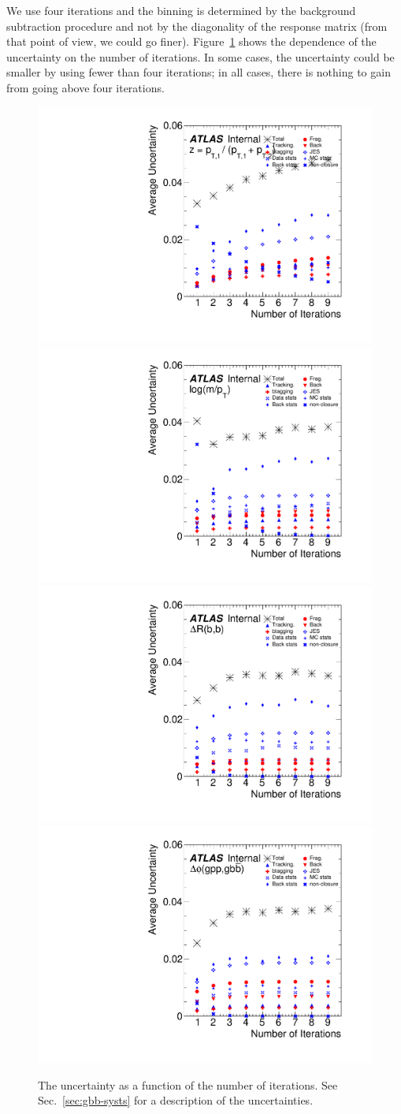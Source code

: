 \label{app:gbb-unfolding:optimization}
We use four iterations and the binning is determined by the background subtraction procedure and not by the diagonality of the response matrix (from that point of view, we could go finer).  Figure~\ref{fig:gbb-iterations} shows the dependence of the uncertainty on the number of iterations.  In some cases, the uncertainty could be smaller by using fewer than four iterations; in all cases, there is nothing to gain from going above four iterations.



\begin{figure}[htpb!]
\begin{center}
  \includegraphics[width=0.45\linewidth]{figures/gbb/Unfolding/IterationsTest_ZpT}
  \includegraphics[width=0.45\linewidth]{figures/gbb/Unfolding/IterationsTest_fracmasspt}
  \includegraphics[width=0.45\linewidth]{figures/gbb/Unfolding/IterationsTest_dR}
  \includegraphics[width=0.45\linewidth]{figures/gbb/Unfolding/IterationsTest_dphi}
\caption[]{The uncertainty as a function of the number of iterations.  See Sec.~\ref{sec:gbb-systs} for a description of the uncertainties. } 
\label{fig:gbb-iterations}
\end{center}
\end{figure}



